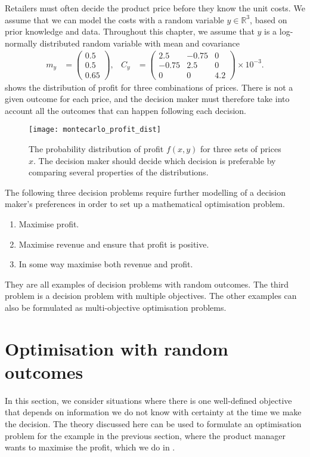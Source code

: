\documentclass[main.tex]{subfiles}
\begin{document}
Retailers must often decide the product price before they know the
unit costs. We assume that we can model the costs with a random
variable $y\in\mathbb{R}^3$, based on prior knowledge and data.
Throughout this chapter, we  assume that $y$ is a log-normally
distributed random variable with mean and covariance
\begin{align}
  m_y
  &= \begin{pmatrix}0.5\\0.5\\0.65
  \end{pmatrix},
  &C_y
  &=\begin{pmatrix}
    2.5&-0.75&0\\
    -0.75&2.5&0\\
    0&0&4.2
  \end{pmatrix}
         \times 10^{-3}.
\end{align}
 shows the distribution of
profit for three combinations of prices. There is not a given outcome
for each price, and the decision maker must therefore take into
account all the outcomes that can happen following each decision.
\begin{figure}[htb]
  \centering
  \texttt{[image: montecarlo\_profit\_dist]}
  \caption{The probability distribution of profit $f(x,y)$ for three
    sets of prices $x$.
    The decision maker should decide which decision is preferable by comparing
    several properties of the distributions.
  }\label{fig:example_profit_distributions}
\end{figure}

The following three decision problems require further modelling of a
decision maker's preferences in order to set up a mathematical
optimisation problem.
\begin{enumerate}
\item Maximise profit.
\item Maximise revenue and ensure that profit is positive.
\item In some way maximise both revenue and profit.
\end{enumerate}
They are all examples of decision problems with random outcomes.
The third problem is a decision problem with
multiple objectives. The other examples can also be
formulated as multi-objective optimisation problems.

\section{Optimisation with random outcomes}\label{sec:one_optim_random_outcomes}
In this section, we consider situations where there is one
well-defined objective that depends on  information we do not know
with certainty at the time we make the decision.
The theory discussed here can be used to formulate an optimisation problem
for the example in the previous section, where the product manager
wants to maximise the profit, which we do in
.
\end{document}
